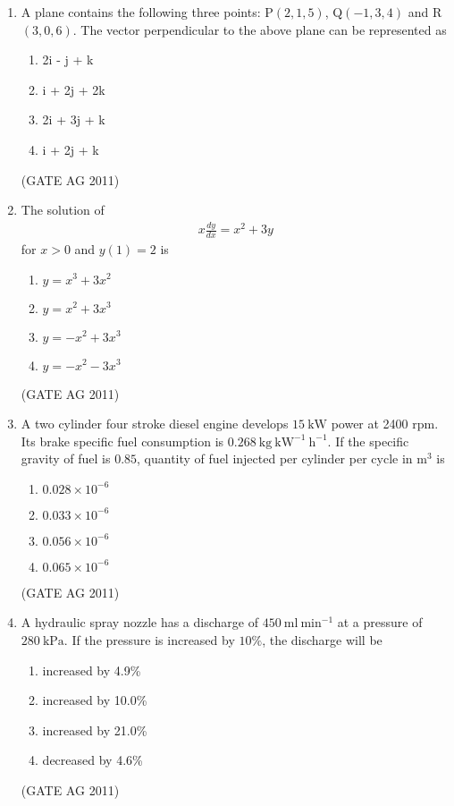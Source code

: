 \documentclass[journal,12pt,onecolumn]{IEEEtran}
\theoremstyle{remark}
\begin{document}
\begin{enumerate}
\item A plane contains the following three points: P$(2,1,5)$, Q$(-1,3,4)$ and R$(3,0,6)$.  
The vector perpendicular to the above plane can be represented as
\begin{multicols}{4}
\begin{enumerate}
\item 2i - j + k
\item i + 2j + 2k
\item 2i + 3j + k
\item i + 2j + k
\end{enumerate}
\end{multicols}
\hfill{(GATE AG 2011)}

\item The solution of 
\begin{align*}
    x \frac{dy}{dx} = x^2 + 3y
\end{align*}
for $x>0$ and $y(1)=2$ is
\begin{multicols}{4}
\begin{enumerate}
\item $y = x^3 + 3x^2$
\item $y = x^2 + 3x^3$
\item $y = -x^2 + 3x^3$
\item $y = -x^2 - 3x^3$
\end{enumerate}
\end{multicols}
\hfill{(GATE AG 2011)}

\item A two cylinder four stroke diesel engine develops $15\ \mathrm{kW}$ power at 2400 rpm.  
Its brake specific fuel consumption is $0.268\ \mathrm{kg\ kW^{-1}\ h^{-1}}$.  
If the specific gravity of fuel is $0.85$, quantity of fuel injected per cylinder per cycle in $\mathrm{m}^3$ is
\begin{multicols}{4}
\begin{enumerate}
\item $0.028 \times 10^{-6}$
\item $0.033 \times 10^{-6}$
\item $0.056 \times 10^{-6}$
\item $0.065 \times 10^{-6}$
\end{enumerate}
\end{multicols}
\hfill{(GATE AG 2011)}

\item A hydraulic spray nozzle has a discharge of $450\ \mathrm{ml\ min^{-1}}$ at a pressure of $280\ \mathrm{kPa}$.  
If the pressure is increased by $10\%$, the discharge will be
\begin{multicols}{4}
\begin{enumerate}
\item increased by 4.9\%
\item increased by 10.0\%
\item increased by 21.0\%
\item decreased by 4.6\%
\end{enumerate}
\end{multicols}
\hfill{(GATE AG 2011)}


\end{enumerate}
\end{document}
